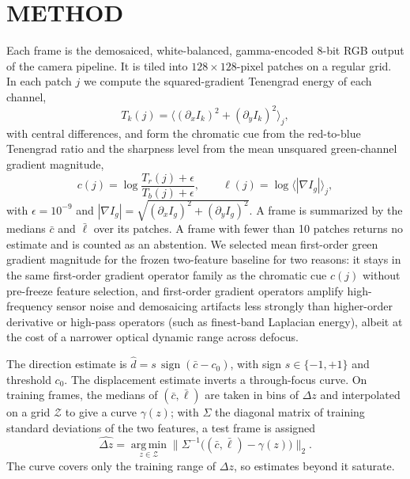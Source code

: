 \documentclass{ieee-ojvt}
\begin{document}
\section{METHOD}
Each frame is the demosaiced, white-balanced, gamma-encoded 8-bit RGB output of the camera pipeline. It is tiled into $128\times128$-pixel patches on a regular grid. In each patch $j$ we compute the squared-gradient Tenengrad energy of each channel,
\begin{equation}
T_k(j)=\bigl\langle(\partial_x I_k)^2+(\partial_y I_k)^2\bigr\rangle_j ,
\end{equation}
with central differences, and form the chromatic cue from the red-to-blue Tenengrad ratio and the sharpness level from the mean unsquared green-channel gradient magnitude,
\begin{equation}
c(j)=\log\frac{T_r(j)+\epsilon}{T_b(j)+\epsilon},\qquad \ell(j)=\log\bigl\langle|\nabla I_g|\bigr\rangle_j ,
\end{equation}
with $\epsilon=10^{-9}$ and $|\nabla I_g|=\sqrt{(\partial_x I_g)^2+(\partial_y I_g)^2}$. A frame is summarized by the medians $\bar c$ and $\bar\ell$ over its patches. A frame with fewer than 10 patches returns no estimate and is counted as an abstention. We selected mean first-order green gradient magnitude for the frozen two-feature baseline for two reasons: it stays in the same first-order gradient operator family as the chromatic cue $c(j)$ without pre-freeze feature selection, and first-order gradient operators amplify high-frequency sensor noise and demosaicing artifacts less strongly than higher-order derivative or high-pass operators (such as finest-band Laplacian energy), albeit at the cost of a narrower optical dynamic range across defocus.

The direction estimate is $\hat d=s\,\operatorname{sign}(\bar c-c_0)$, with sign $s\in\{-1,+1\}$ and threshold $c_0$. The displacement estimate inverts a through-focus curve. On training frames, the medians of $(\bar c,\bar\ell)$ are taken in bins of $\Delta z$ and interpolated on a grid $\mathcal{Z}$ to give a curve $\gamma(z)$; with $\Sigma$ the diagonal matrix of training standard deviations of the two features, a test frame is assigned
\begin{equation}
\widehat{\Delta z}=\operatorname*{arg\,min}_{z\in\mathcal{Z}}\bigl\|\Sigma^{-1}\bigl((\bar c,\bar\ell)-\gamma(z)\bigr)\bigr\|_2 .
\label{eq:invert}
\end{equation} The curve covers only the training range of $\Delta z$, so estimates beyond it saturate.
\end{document}
